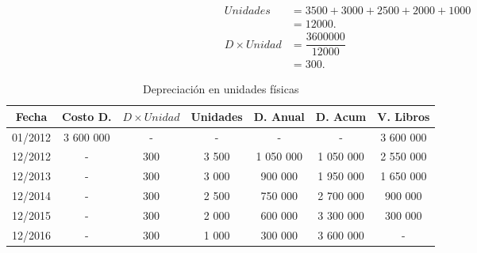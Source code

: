 \documentclass[10pt,a4paper]{report}
\begin{document}
	



\begin{align*} 
Unidades        &= 3500 + 3000 + 2 500 + 2000 + 1000 \\
                &= 12000.\\
D \times Unidad &= \dfrac{3 600 000}{12000}\\
                &= 300.
\end{align*}



	\begin{table}[h]
	\centering
	\caption{Depreciación en unidades físicas}	
	
	\begin{tabular}{|c|c|c|c|c|c|c|} \hline
	
	Fecha   & Costo D.  & $D \times Unidad$ & Unidades & D. Anual  & D. Acum   & V. Libros \\ \hline

	01/2012 & 3 600 000 & -                 & -        & -         & -         & 3 600 000 \\ \hline

	12/2012 & -         & 300               & 3 500    & 1 050 000 & 1 050 000 & 2 550 000 \\ \hline

	12/2013 & -         & 300               & 3 000    & 900 000   & 1 950 000 & 1 650 000 \\ \hline

	12/2014 & -         & 300               & 2 500    & 750 000   & 2 700 000 & 900 000   \\ \hline

	12/2015 & -         & 300               & 2 000    & 600 000   & 3 300 000 & 300 000   \\ \hline

	12/2016 & -         & 300               & 1 000    & 300 000   & 3 600 000 & -         \\ \hline
	\end{tabular}
	\end{table}
	
\end{document}
